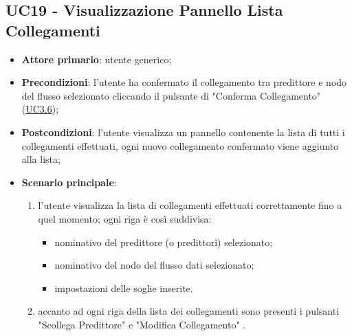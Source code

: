 	

	\label{par:UC19}
	\subsection{UC19 - Visualizzazione Pannello Lista Collegamenti}
		\begin{itemize}
			\item\textbf{Attore primario}: utente generico;
			\item\textbf{Precondizioni}: l’utente ha confermato il collegamento tra predittore e nodo del flusso selezionato cliccando il pulsante di "Conferma Collegamento" (\hyperref[par:UC3.6]{UC3.6});
			\item\textbf{Postcondizioni}: l’utente visualizza un pannello contenente la lista di tutti i collegamenti effettuati, ogni nuovo collegamento confermato viene aggiunto alla lista;
			\item\textbf{Scenario principale}:
				\begin{enumerate}
					\item l'utente visualizza la lista di collegamenti effettuati correttamente fino a quel momento; ogni riga è così suddivisa:
					\begin{itemize}
						\item nominativo del predittore (o predittori) selezionato;
						\item nominativo del nodo del flusso dati selezionato;
						\item impostazioni delle soglie inserite.
					\end{itemize}
					\item accanto ad ogni riga della lista dei collegamenti sono presenti i pulsanti "Scollega Predittore" e "Modifica Collegamento" .	
				\end{enumerate}		
		\end{itemize}


	\label{par:UC20}
